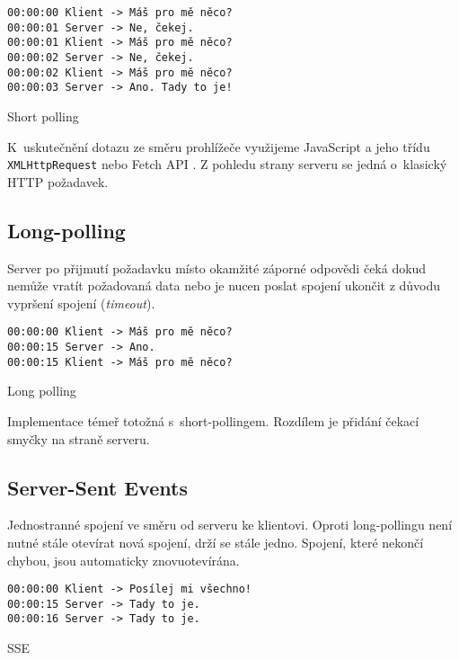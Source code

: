 \begin{listing}[ht]
\begin{verbatim}
00:00:00 Klient -> Máš pro mě něco?
00:00:01 Server -> Ne, čekej.
00:00:01 Klient -> Máš pro mě něco?
00:00:02 Server -> Ne, čekej.
00:00:02 Klient -> Máš pro mě něco?
00:00:03 Server -> Ano. Tady to je!
\end{verbatim}
\caption{Short polling}
\end{listing}

K~uskutečnění dotazu ze směru prohlížeče využijeme JavaScript a jeho třídu \verb|XMLHttpRequest| nebo Fetch API \cite{fetch_api}.
Z pohledu strany serveru se jedná o~klasický HTTP požadavek.

\subsection{Long-polling}

Server po přijmutí požadavku místo okamžité záporné odpovědi čeká dokud nemůže vratít požadovaná data nebo je nucen poslat spojení ukončit z důvodu vypršení spojení (\textit{timeout}).

\begin{listing}[ht]
\begin{verbatim}
00:00:00 Klient -> Máš pro mě něco?
00:00:15 Server -> Ano.
00:00:15 Klient -> Máš pro mě něco?
\end{verbatim}
\caption{Long polling}
\end{listing}

Implementace témeř totožná s~short-pollingem.
Rozdílem je přidání čekací smyčky na straně serveru.

\subsection{Server-Sent Events}

Jednostranné spojení ve směru od serveru ke klientovi.
Oproti long-pollingu není nutné stále otevírat nová spojení, drží se stále jedno.
Spojení, které nekončí chybou, jsou automaticky znovuotevírána.

\begin{listing}[ht]
\begin{verbatim}
00:00:00 Klient -> Posílej mi všechno!
00:00:15 Server -> Tady to je.
00:00:16 Server -> Tady to je.
\end{verbatim}
\caption{SSE}
\end{listing}

